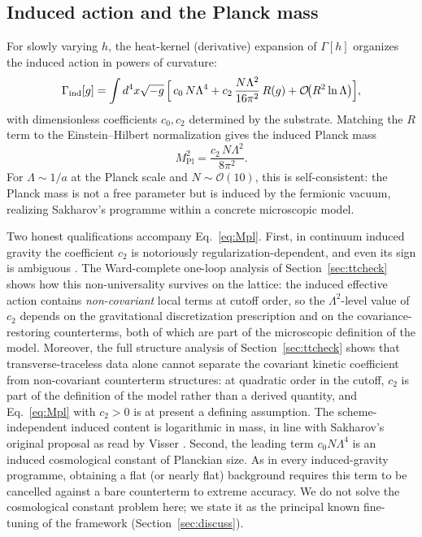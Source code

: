 \documentclass[11pt,a4paper]{article}
\begin{document}
\subsection{Induced action and the Planck mass}

For slowly varying $h$, the heat-kernel (derivative) expansion of
$\Gamma[h]$ organizes the induced action in powers of curvature:
\begin{equation}
\Gamma_{\mathrm{ind}}[g] = \int d^4x \sqrt{-g}\,
\Bigl[\, c_0\,N\Lambda^4
+ c_2\,\frac{N\Lambda^2}{16\pi^2}\,R(g)
+ \mathcal{O}\!\bigl(R^2 \ln\Lambda\bigr) \Bigr],
\label{eq:induced}
\end{equation}
with dimensionless coefficients $c_0, c_2$ determined by the
substrate.
Matching the $R$ term to the Einstein--Hilbert normalization gives
the induced Planck mass
\begin{equation}
M_{\mathrm{Pl}}^2 = \frac{c_2\,N\Lambda^2}{8\pi^2}.
\label{eq:Mpl}
\end{equation}
For $\Lambda \sim 1/a$ at the Planck scale and
$N \sim \mathcal{O}(10)$, this is self-consistent: the Planck mass
is not a free parameter but is induced by the fermionic vacuum,
realizing Sakharov's programme within a concrete microscopic model.

Two honest qualifications accompany Eq.~\eqref{eq:Mpl}.
First, in continuum induced gravity the coefficient $c_2$ is
notoriously regularization-dependent, and even its sign is
ambiguous \cite{Visser:2002ew}.
The Ward-complete one-loop analysis of Section~\ref{sec:ttcheck}
shows how this non-universality survives on the lattice: the
induced effective action contains \emph{non-covariant} local terms
at cutoff order, so the $\Lambda^2$-level value of $c_2$ depends on
the gravitational discretization prescription and on the
covariance-restoring counterterms, both of which are part of the
microscopic definition of the model.
Moreover, the full structure analysis of
Section~\ref{sec:ttcheck} shows that transverse-traceless data
alone cannot separate the covariant kinetic coefficient from
non-covariant counterterm structures: at quadratic order in the
cutoff, $c_2$ is part of the definition of the model rather than a
derived quantity, and Eq.~\eqref{eq:Mpl} with $c_2 > 0$ is at
present a defining assumption.
The scheme-independent induced content is logarithmic in mass, in
line with Sakharov's original proposal as read by Visser
\cite{Visser:2002ew}.
Second, the leading term $c_0 N\Lambda^4$ is an induced
cosmological constant of Planckian size.
As in every induced-gravity programme, obtaining a flat (or nearly
flat) background requires this term to be cancelled against a bare
counterterm to extreme accuracy.
We do not solve the cosmological constant problem here; we state
it as the principal known fine-tuning of the framework
(Section~\ref{sec:discuss}).
\end{document}
